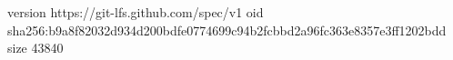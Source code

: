 version https://git-lfs.github.com/spec/v1
oid sha256:b9a8f82032d934d200bdfe0774699c94b2fcbbd2a96fc363e8357e3ff1202bdd
size 43840
